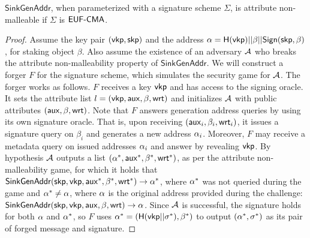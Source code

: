 \begin{lemma}\label{lem:sink_addrgen_attribute_mall}
    $\mathsf{SinkGenAddr}$, when parameterized with a signature scheme
    $\Sigma$, is attribute non-malleable if $\Sigma$ is $\textsf{EUF-CMA}$.
\end{lemma}

\begin{proof}
    Assume the key pair $(\mathsf{vkp},\mathsf{skp})$ and the address
    $\alpha = \mathsf{H}(\mathsf{vkp}) || \beta || \mathsf{Sign}(\mathsf{skp},
    \beta)$, for staking object $\beta$.
    Also assume the existence of an adversary $\mathcal{A}$ who breaks the
    attribute non-malleability property of $\mathsf{SinkGenAddr}$. We will
    construct a forger $F$ for the signature scheme, which simulates the
    security game for $\mathcal{A}$. The forger works as follows.
    $F$ receives a key $\mathsf{vkp}$ and has access to the signing
    oracle. It sets the attribute list $l = (\mathsf{vkp}, \mathsf{aux}, \beta,
    \mathsf{wrt})$ and initializes $\mathcal{A}$ with public attributes $(\mathsf{aux}, \beta,
    \mathsf{wrt})$.  Note that $F$ answers generation address queries by using its own
    signature oracle. That is, upon receiving $(\mathsf{aux}_i, \beta_i, \mathsf{wrt}_i)$, it
    issues a signature query on $\beta_i$ and generates a new address
    $\alpha_i$.  Moreover, $F$ may receive a metadata query on issued addresses
    $\alpha_{i}$ and answer by revealing $\mathsf{vkp}$.
    By hypothesis $\mathcal{A}$ outputs a list $(\alpha^\ast, \mathsf{aux}^\ast,
    \beta^\ast, \mathsf{wrt}^\ast)$, as per the attribute non-malleability game, for
    which it holds that $\mathsf{SinkGenAddr}(\mathsf{skp},
    \mathsf{vkp}, \mathsf{aux}^\ast, \beta^\ast, \mathsf{wrt}^\ast) \rightarrow \alpha^\ast$,
    where $\alpha^\ast$ was not queried during the game and $\alpha^\ast \neq
    \alpha$, where $\alpha$ is the original address provided during the
    challenge: $\mathsf{SinkGenAddr}(\mathsf{skp}, \mathsf{vkp}, \mathsf{aux},
    \beta, \mathsf{wrt}) \rightarrow \alpha$.
    Since $\mathcal{A}$ is successful, the signature holds for both $\alpha$ and
    $\alpha^\ast$, so $F$ uses $\alpha^\ast = (\mathsf{H}(\mathsf{vkp} ||
    \sigma^\ast), \beta^\ast)$ to output $(\alpha^\ast, \sigma^\ast)$ as its pair
    of forged message and signature.
\end{proof}

